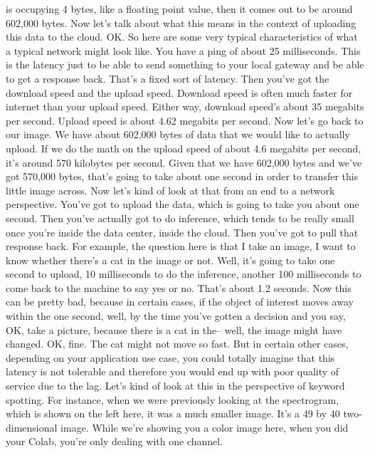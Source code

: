   is occupying 4 bytes, like a floating point value,
  then it comes out to be around 602,000 bytes.
  Now let's talk about what this means in the context
  of uploading this data to the cloud.
  OK.
  So here are some very typical characteristics
  of what a typical network might look like.
  You have a ping of about 25 milliseconds.
  This is the latency just to be able to send something to your local gateway
  and be able to get a response back.
  That's a fixed sort of latency.
  Then you've got the download speed and the upload speed.
  Download speed is often much faster for internet than your upload speed.
  Either way, download speed's about 35 megabits per second.
  Upload speed is about 4.62 megabits per second.
  Now let's go back to our image.
  We have about 602,000 bytes of data that we would like to actually upload.
  If we do the math on the upload speed of about 4.6 megabits per second,
  it's around 570 kilobytes per second.
  Given that we have 602,000 bytes and we've got 570,000 bytes,
  that's going to take about one second in order
  to transfer this little image across.
  Now let's kind of look at that from an end to a network perspective.
  You've got to upload the data, which is going to take you about one second.
  Then you've actually got to do inference,
  which tends to be really small once you're inside the data center,
  inside the cloud.
  Then you've got to pull that response back.
  For example, the question here is that I take an image,
  I want to know whether there's a cat in the image or not.
  Well, it's going to take one second to upload, 10
  milliseconds to do the inference, another 100 milliseconds
  to come back to the machine to say yes or no.
  That's about 1.2 seconds.
  Now this can be pretty bad, because in certain cases,
  if the object of interest moves away within the one second, well,
  by the time you've gotten a decision and you say,
  OK, take a picture, because there is a cat in the--
  well, the image might have changed.
  OK, fine.
  The cat might not move so fast.
  But in certain other cases, depending on your application use case,
  you could totally imagine that this latency is not tolerable
  and therefore you would end up with poor quality of service due to the lag.
  Let's kind of look at this in the perspective of keyword spotting.
  For instance, when we were previously looking
  at the spectrogram, which is shown on the left here,
  it was a much smaller image.
  It's a 49 by 40 two-dimensional image.
  While we're showing you a color image here, when you did your Colab,
  you're only dealing with one channel.
